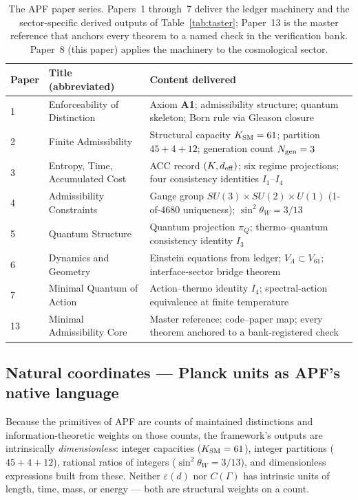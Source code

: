 \documentclass[11pt]{article}
\newcommand{\Aone}{\textbf{A1}}
\begin{document}
\begin{table}[h]
\centering
\small
\begin{tabularx}{\textwidth}{@{}l l X@{}}
\toprule
\textbf{Paper} & \textbf{Title (abbreviated)} & \textbf{Content delivered} \\
\midrule
1  & Enforceability of Distinction    & Axiom \Aone{}; admissibility structure; quantum skeleton; Born rule via Gleason closure \\
2  & Finite Admissibility              & Structural capacity $K_{\rm SM}=61$; partition $45 + 4 + 12$; generation count $N_{\rm gen}=3$ \\
3  & Entropy, Time, Accumulated Cost   & ACC record $(K, d_{\rm eff})$; six regime projections; four consistency identities $I_1$--$I_4$ \\
4  & Admissibility Constraints         & Gauge group $SU(3)\!\times\!SU(2)\!\times\!U(1)$ (1-of-4680 uniqueness); $\sin^2\theta_W = 3/13$ \\
5  & Quantum Structure                 & Quantum projection $\pi_Q$; thermo--quantum consistency identity $I_3$ \\
6  & Dynamics and Geometry             & Einstein equations from ledger; $V_\Lambda \subset V_{61}$; interface-sector bridge theorem \\
7  & Minimal Quantum of Action         & Action--thermo identity $I_4$; spectral-action equivalence at finite temperature \\
13 & Minimal Admissibility Core        & Master reference; code--paper map; every theorem anchored to a bank-registered check \\
\bottomrule
\end{tabularx}
\caption{The APF paper series.  Papers~1 through~7 deliver the ledger machinery and the sector-specific derived outputs of Table~\ref{tab:taster}; Paper~13 is the master reference that anchors every theorem to a named check in the verification bank.  Paper~8 (this paper) applies the machinery to the cosmological sector.}\label{tab:paper_dependencies}
\end{table}

\subsection{Natural coordinates --- Planck units as APF's native language}\label{sec:intro_planck}

Because the primitives of APF are counts of maintained distinctions and information-theoretic weights on those counts, the framework's outputs are intrinsically \emph{dimensionless}: integer capacities ($K_{\rm SM} = 61$), integer partitions ($45 + 4 + 12$), rational ratios of integers ($\sin^2\theta_W = 3/13$), and dimensionless expressions built from these. Neither $\varepsilon(d)$ nor $C(\Gamma)$ has intrinsic units of length, time, mass, or energy --- both are structural weights on a count.
\end{document}
